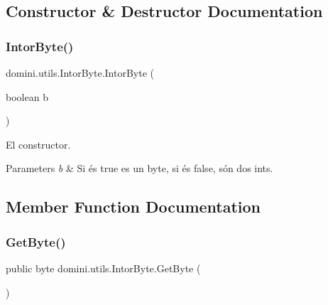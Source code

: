 \subsection{Constructor \& Destructor Documentation}
\mbox{\label{classdomini_1_1utils_1_1IntorByte_ac2bae675cf6c4d8880acedeefaf24060}} 
\subsubsection{\texorpdfstring{Intor\+Byte()}{IntorByte()}}
{\footnotesize\ttfamily domini.\+utils.\+Intor\+Byte.\+Intor\+Byte (\begin{DoxyParamCaption}\item[{boolean}]{b }\end{DoxyParamCaption})\hspace{0.3cm}{\ttfamily [inline]}}



El constructor. 


\begin{DoxyParams}{Parameters}
{\em b} & Si és true es un byte, si és false, són dos int\textquotesingle{}s. \\
\hline
\end{DoxyParams}


\subsection{Member Function Documentation}
\mbox{\label{classdomini_1_1utils_1_1IntorByte_afd907b7001011bbca374605fb11491f4}} 
\subsubsection{\texorpdfstring{Get\+Byte()}{GetByte()}}
{\footnotesize\ttfamily public byte domini.\+utils.\+Intor\+Byte.\+Get\+Byte (\begin{DoxyParamCaption}{ }\end{DoxyParamCaption})\hspace{0.3cm}{\ttfamily [inline]}}



